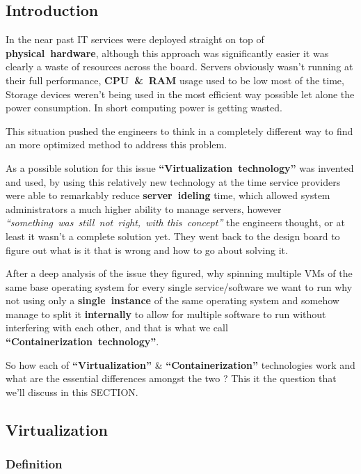 \documentclass[
  14pt,
  english,
  a4paper,
]{scrreprt}
\begin{document}
\hypertarget{introduction-3}{%
\subsection{Introduction}\label{introduction-3}}

In the near past IT services were deployed straight on top of
\textbf{physical~hardware}, although this approach was significantly
easier it was clearly a waste of resources across the board. Servers
obviously wasn't running at their full performance, \textbf{CPU~\&~RAM}
usage used to be low most of the time, Storage devices weren't being
used in the most efficient way possible let alone the power consumption.
In short computing power is getting wasted.

This situation pushed the engineers to think in a completely different
way to find an more optimized method to address this problem.

As a possible solution for this issue
\textbf{``Virtualization~technology''} was invented and used, by using
this relatively new technology at the time service providers were able
to remarkably reduce \textbf{server~ideling} time, which allowed system
administrators a much higher ability to manage servers, however
\emph{``something~was~still~not~right,~with this~concept''} the
engineers thought, or at least it wasn't a complete solution yet. They
went back to the design board to figure out what is it that is wrong and
how to go about solving it.

After a deep analysis of the issue they figured, why spinning multiple
VMs of the same base operating system for every single service/software
we want to run why not using only a \textbf{single~instance} of the same
operating system and somehow manage to split it \textbf{internally} to
allow for multiple software to run without interfering with each other,
and that is what we call \textbf{``Containerization~technology''}.

So how each of \textbf{``Virtualization''} \&
\textbf{``Containerization''} technologies work and what are the
essential differences amongst the two ? This it the question that we'll
discuss in this SECTION.

\hypertarget{virtualization}{%
\subsection{Virtualization}\label{virtualization}}

\hypertarget{definition-2}{%
\subsubsection{Definition}\label{definition-2}}
\end{document}
